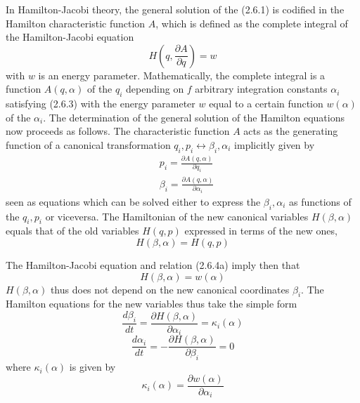 \documentclass{article}
\begin{document}
In Hamilton-Jacobi theory, the general solution of the (2.6.1) is codified in the Hamilton characteristic function $A$, which is defined as the complete integral of the Hamilton-Jacobi equation
$$
\begin{equation*}
H\left(q, \frac{\partial A}{\partial q}\right)=w \tag{2.6.3}
\end{equation*}
$$
with $w$ is an energy parameter. Mathematically, the complete integral is a function $A(q, \alpha)$ of the $q_{i}$ depending on $f$ arbitrary integration constants $\alpha_{i}$ satisfying (2.6.3) with the energy parameter $w$ equal to a certain function $w(\alpha)$ of the $\alpha_{i}$. The determination of the general solution of the Hamilton equations now proceeds as follows. The characteristic function $A$ acts as the generating function of a canonical transformation $q_{i}, p_{i} \leftrightarrow \beta_{i}, \alpha_{i}$ implicitly given by
$$
\begin{align*}
& p_{i}=\frac{\partial A(q, \alpha)}{\partial q_{i}}  \tag{2.6.4a}\\
& \beta_{i}=\frac{\partial A(q, \alpha)}{\partial \alpha_{i}} \tag{2.6.4~b}
\end{align*}
$$
seen as equations which can be solved either to express the $\beta_{i}, \alpha_{i}$ as functions of the $q_{i}, p_{i}$ or viceversa. The Hamiltonian of the new canonical variables $H(\beta, \alpha)$ equals that of the old variables $H(q, p)$ expressed in terms of the new ones,
$$
\begin{equation*}
H(\beta, \alpha)=H(q, p) \tag{2.6.5}
\end{equation*}
$$

The Hamilton-Jacobi equation and relation (2.6.4a) imply then that
$$
\begin{equation*}
H(\beta, \alpha)=w(\alpha) \tag{2.6.6}
\end{equation*}
$$
$H(\beta, \alpha)$ thus does not depend on the new canonical coordinates $\beta_{i}$. The Hamilton equations for the new variables thus take the simple form
$$
\begin{equation*}
\frac{d \beta_{i}}{d t}=\frac{\partial H(\beta, \alpha)}{\partial \alpha_{i}}=\kappa_{i}(\alpha) \tag{2.6.7a}
\end{equation*}
$$
$$
\begin{equation*}
\frac{d \alpha_{i}}{d t}=-\frac{\partial H(\beta, \alpha)}{\partial \beta_{i}}=0 \tag{2.6.7b}
\end{equation*}
$$
where $\kappa_{i}(\alpha)$ is given by
$$
\begin{equation*}
\kappa_{i}(\alpha)=\frac{\partial w(\alpha)}{\partial \alpha_{i}} \tag{2.6.8}
\end{equation*}
$$
\end{document}

